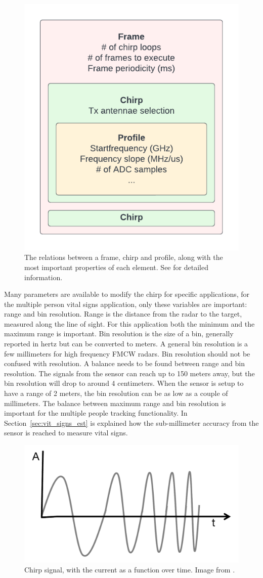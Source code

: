 \begin{figure}[t]
\centering
\includegraphics[width=.5\textwidth]{figures/background/chirp frame profile.pdf}
\caption{The relations between a frame, chirp and profile, along with the most important properties of each element. See \cite{mmwavesdk_website} for detailed information.}
\label{fig:chirpframeprofile}
\end{figure}

Many parameters are available to modify the chirp for specific applications, for the multiple person vital signs application, only these variables are important: range and bin resolution. Range is the distance from the radar to the target, measured along the line of sight. For this application both the minimum and the maximum range is important. Bin resolution is the size of a bin, generally reported in hertz but can be converted to meters. A general bin resolution is a few millimeters for high frequency FMCW radars. Bin resolution should not be confused with resolution. A balance needs to be found between range and bin resolution. The signals from the sensor can reach up to 150 meters away, but the bin resolution will drop to around 4 centimeters. When the sensor is setup to have a range of 2 meters, the bin resolution can be as low as a couple of millimeters. The balance between maximum range and bin resolution is important for the multiple people tracking functionality. In Section~\ref{sec:vit_signs_est} is explained how the sub-millimeter accuracy from the sensor is reached to measure vital signs.

\begin{figure}[t]
\centering
\includegraphics[width=.5\textwidth]{figures/background/chirp.png}
\caption{Chirp signal, with the current as a function over time. Image from \cite{mmwave_fundamentals_website}.}
\label{fig:chirp}
\end{figure}


